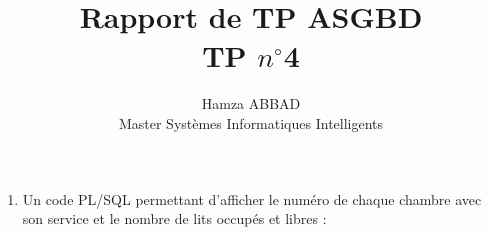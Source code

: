 \documentclass[12pt,a4paper]{article}
\author{Hamza ABBAD\\ Master Systèmes Informatiques Intelligents}
\title{\textbf{Rapport de TP ASGBD} \\ TP $n^{\circ}$4}
\begin{document}
\maketitle
\begin{enumerate}
    \item Un code PL/SQL permettant d'afficher le numéro de chaque chambre avec son
    service et le nombre de lits occupés et libres :
    \inputminted[firstline=4, lastline=18]{SQL}{../Scripts/TP4.sql}
\end{enumerate}
\end{document}
